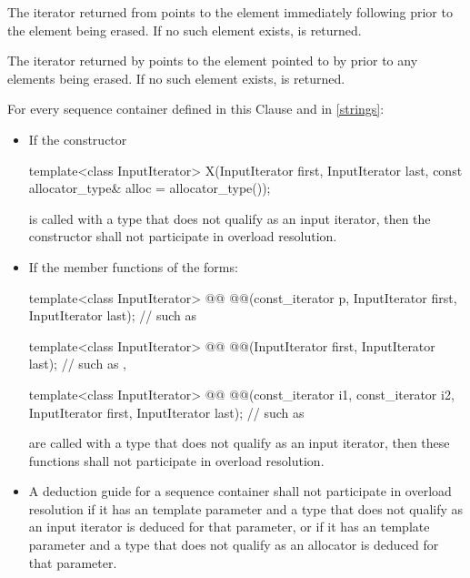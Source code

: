\pnum
The iterator returned from
points to the element immediately following
prior to the element being erased.
If no such element exists,
is returned.

\pnum
The iterator returned by
points to the element pointed to by
prior to any elements being erased.
If no such element exists,
is returned.

\pnum
For every sequence container defined in this Clause and in \ref{strings}:
\begin{itemize}
\item If the constructor
\begin{codeblock}
template<class InputIterator>
  X(InputIterator first, InputIterator last,
    const allocator_type& alloc = allocator_type());
\end{codeblock}
is called with a type  that does not qualify as an input
iterator, then the constructor
shall not participate in overload resolution.

\item If the member functions of the forms:
\begin{codeblock}
template<class InputIterator>
  @@ @@(const_iterator p,
                InputIterator first, InputIterator last);       // such as 

template<class InputIterator>
  @@ @@(InputIterator first, InputIterator last);       // such as , 

template<class InputIterator>
  @@ @@(const_iterator i1, const_iterator i2,
                InputIterator first, InputIterator last);       // such as 
\end{codeblock}
are called with a type  that does not qualify as an input
iterator, then these functions
shall not participate in overload resolution.

\item A deduction guide for a sequence container shall not participate in overload resolution
if it has an  template parameter and a type that does not
qualify as an input iterator is deduced for that parameter,
or if it has an  template parameter and a type that does not
qualify as an allocator is deduced for that parameter.
\end{itemize}

